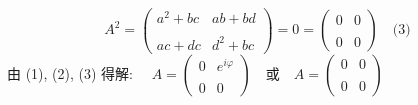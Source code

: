 $$A^2 =  \begin{pmatrix} a^2 + b c & a b + b d \\\\ a c + d c & d^2 + b c \end{pmatrix} = 0 = \begin{pmatrix} 0 & 0 \\\\ 0 & 0 \end{pmatrix} \quad \text{(3)}~$$
由 (1), (2), (3) 得解: $\quad A = \begin{pmatrix} 0 & e^{i \varphi} \\\\ 0 & 0 \end{pmatrix} \quad \text{或} \quad A = \begin{pmatrix} 0 & 0 \\\\ 0 & 0 \end{pmatrix}$
